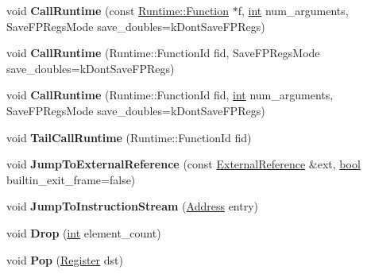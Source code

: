 \begin{DoxyCompactItemize}
void {\bfseries Call\+Runtime} (const \mbox{\hyperlink{structv8_1_1internal_1_1Runtime_1_1Function}{Runtime\+::\+Function}} $\ast$f, \mbox{\hyperlink{classint}{int}} num\+\_\+arguments, Save\+F\+P\+Regs\+Mode save\+\_\+doubles=k\+Dont\+Save\+F\+P\+Regs)
\item 
\mbox{\label{classv8_1_1internal_1_1MacroAssembler_a797b53d578cd762b40c56f4485bf584e}} 
void {\bfseries Call\+Runtime} (Runtime\+::\+Function\+Id fid, Save\+F\+P\+Regs\+Mode save\+\_\+doubles=k\+Dont\+Save\+F\+P\+Regs)
\item 
\mbox{\label{classv8_1_1internal_1_1MacroAssembler_a87a8fd8a93b463d8485753c6d0d0465e}} 
void {\bfseries Call\+Runtime} (Runtime\+::\+Function\+Id fid, \mbox{\hyperlink{classint}{int}} num\+\_\+arguments, Save\+F\+P\+Regs\+Mode save\+\_\+doubles=k\+Dont\+Save\+F\+P\+Regs)
\item 
\mbox{\label{classv8_1_1internal_1_1MacroAssembler_aefb569829758555a7394ce1d34ed2bef}} 
void {\bfseries Tail\+Call\+Runtime} (Runtime\+::\+Function\+Id fid)
\item 
\mbox{\label{classv8_1_1internal_1_1MacroAssembler_ad7a8f5a73afff9391fa981d05edf8d0d}} 
void {\bfseries Jump\+To\+External\+Reference} (const \mbox{\hyperlink{classv8_1_1internal_1_1ExternalReference}{External\+Reference}} \&ext, \mbox{\hyperlink{classbool}{bool}} builtin\+\_\+exit\+\_\+frame=false)
\item 
\mbox{\label{classv8_1_1internal_1_1MacroAssembler_a18fc118dd1ecc3b59755acce49880671}} 
void {\bfseries Jump\+To\+Instruction\+Stream} (\mbox{\hyperlink{classuintptr__t}{Address}} entry)
\item 
\mbox{\label{classv8_1_1internal_1_1MacroAssembler_ab60d318b21d8640a2407ffecdc364dec}} 
void {\bfseries Drop} (\mbox{\hyperlink{classint}{int}} element\+\_\+count)
\item 
\mbox{\label{classv8_1_1internal_1_1MacroAssembler_ac85bcb0e32b08420036754c0655ca909}} 
void {\bfseries Pop} (\mbox{\hyperlink{classv8_1_1internal_1_1Register}{Register}} dst)

\end{DoxyCompactItemize}
